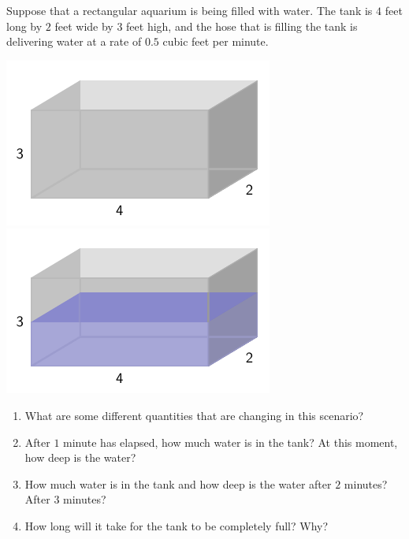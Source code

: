 \documentclass{ximera}
\begin{document}
\begin{exploration}
Suppose that a rectangular aquarium is being filled with water.  The tank is $4$ feet long by $2$ feet wide by $3$ feet high, and the hose that is filling the tank is delivering water at a rate of $0.5$ cubic feet per minute.

\begin{image}
\includegraphics{tandem-empty-aquarium.pdf}
\includegraphics{tandem-filled-aquarium.pdf}
\end{image}

\begin{enumerate}[label=\alph*.]
\item What are some different quantities that are changing in this scenario?%
\item After $1$ minute has elapsed, how much water is in the tank?  At this moment, how deep is the water?%
\item How much water is in the tank and how deep is the water after $2$ minutes?  After $3$ minutes?%
\item How long will it take for the tank to be completely full?  Why?%
\end{enumerate}
\end{exploration}


\end{document}
